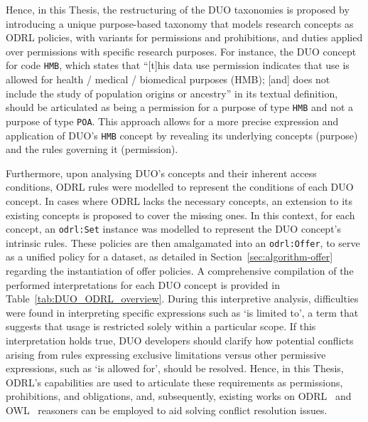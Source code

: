 Hence, in this Thesis, the restructuring of the DUO taxonomies is proposed by introducing a unique purpose-based taxonomy that models research concepts as ODRL policies, with variants for permissions and prohibitions, and duties applied over permissions with specific research purposes.
For instance, the DUO concept for code \texttt{HMB}, which states that ``[t]his data use permission indicates that use is allowed for health / medical / biomedical purposes (HMB); [and] does not include the study of population origins or ancestry'' in its textual definition, should be articulated as being a permission for a purpose of type \texttt{HMB} and not a purpose of type \texttt{POA}.
This approach allows for a more precise expression and application of DUO's \texttt{HMB} concept by revealing its underlying concepts (purpose) and the rules governing it (permission).

Furthermore, upon analysing DUO's concepts and their inherent access conditions, ODRL rules were modelled to represent the conditions of each DUO concept.
In cases where ODRL lacks the necessary concepts, an extension to its existing concepts is proposed to cover the missing ones.
In this context, for each concept, an \texttt{odrl:Set} instance was modelled to represent the DUO concept's intrinsic rules.
These policies are then amalgamated into an \texttt{odrl:Offer}, to serve as a unified policy for a dataset, as detailed in Section~\ref{sec:algorithm-offer} regarding the instantiation of offer policies.
A comprehensive compilation of the performed interpretations for each DUO concept is provided in Table~\ref{tab:DUO_ODRL_overview}.
During this interpretive analysis, difficulties were found in interpreting specific expressions such as `is limited to', a term that suggests that usage is restricted solely within a particular scope.
If this interpretation holds true, DUO developers should clarify how potential conflicts arising from rules expressing exclusive limitations versus other permissive expressions, such as `is allowed for', should be resolved.
Hence, in this Thesis, ODRL's capabilities are used to articulate these requirements as permissions, prohibitions, and obligations, and, subsequently, existing works on ODRL~\citep{pellegrini_automated_2018,de_vos_odrl_2019} and OWL~\citep{bonatti_realtime_2020} reasoners can be employed to aid solving conflict resolution issues.


